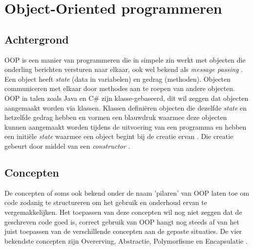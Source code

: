 \section{Object-Oriented programmeren}
\subsection{Achtergrond}
OOP is een manier van programmeren die in simpele zin werkt met objecten die onderling berichten versturen naar elkaar, ook wel bekend als \textit{message passing} \autocite{Armstrong2006}. Een object heeft \textit{state} (data in variabelen) en gedrag (methoden). Objecten communiceren met elkaar door methodes aan te roepen van andere objecten. OOP in talen zoals Java en C\# zijn klasse-gebaseerd, dit wil zeggen dat objecten aangemaakt worden via klassen. Klassen definiëren objecten die dezelfde \textit{state} en hetzelfde gedrag hebben en vormen een blauwdruk waarmee deze objecten kunnen aangemaakt worden tijdens de uitvoering van een programma en hebben een initiële \textit{state} waarmee een object begint bij de creatie ervan \autocite{Bruce2002}. Die creatie gebeurt door middel van een \textit{constructor} \autocite{OracleCorporation2019}.

\subsection{Concepten}
De concepten of soms ook bekend onder de naam 'pilaren' van OOP laten toe om code zodanig te structureren om het gebruik en onderhoud ervan te vergemakkelijken. Het toepassen van deze concepten wil nog niet zeggen dat de geschreven code goed is, correct gebruik van OOP hangt nog steeds af van het juist toepassen van de verschillende concepten aan de gepaste situaties. De vier bekendste concepten zijn Overerving, Abstractie, Polymorfisme en Encapsulatie \autocite{Armstrong2006}.

